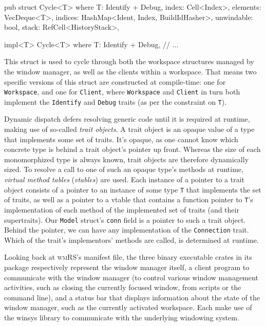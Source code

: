 \begin{rustblock}
  pub struct Cycle<T>
  where
    T: Identify + Debug,
  {
    index: Cell<Index>,
    elements: VecDeque<T>,
    indices: HashMap<Ident, Index, BuildIdHasher>,
    unwindable: bool,
    stack: RefCell<HistoryStack>,
  }

  impl<T> Cycle<T>
  where
      T: Identify + Debug,
  {
    // ...
  }
\end{rustblock}

This  struct is  used to  cycle through  both the  workspace structures  managed
by  the  window  manager, as  well  as  the  clients  within a  workspace.  That
means  two specific  versions of  this struct  are constructed  at compile-time:
one  for \texttt{Workspace},  and  one for  \texttt{Client},
where  \texttt{Workspace} and  \texttt{Client} in  turn both
implement  the \texttt{Identify}  and \texttt{Debug}  traits
(as per the constraint on \texttt{T}).


Dynamic dispatch defers resolving generic code  until it is required at runtime,
making use  of so-called  \textit{trait objects}.  A trait  object is  an opaque
value of a type  that implements some set of traits. It's  opaque, as one cannot
know which  concrete type is behind  a trait object's pointer  up front. Whereas
the size of each monomorphized type is always known, trait objects are therefore
dynamically  sized.  To  resolve  a  call  to  one  of  such  an  opaque  type's
methods at runtime, \textit{virtual  method tables} (\textit{vtables}) are used.
Each  instance  of  a pointer  to  a  trait  object  consists of  a  pointer  to
an  instance  of some  type  \texttt{T}  that  implements the  set  of
traits,  as well  as a  pointer to  a vtable  that contains  a function  pointer
to  \texttt{T}'s  implementation of  each  method  of the  implemented
set  of traits  (and their  supertraits). Our  \texttt{Model} struct's
\texttt{conn} field  is a pointer to  such a trait object.  Behind the
pointer,  we can  have any  implementation of  the \texttt{Connection}
trait. Which of  the trait's implementors' methods are called,  is determined at
runtime.

Looking  back at  \textsc{wmRS}'s  manifest file,  the  three binary  executable
crates in its package respectively represent the window manager itself, a client
program  to communicate  with  the  window manager  (to  control various  window
management  activities,  such as  closing  the  currently focused  window,  from
scripts or the  command line), and a status bar  that displays information about
the state of the window manager, such as the currently activated workspace. Each
make use  of the  winsys library  to communicate  with the  underlying windowing
system.\\

